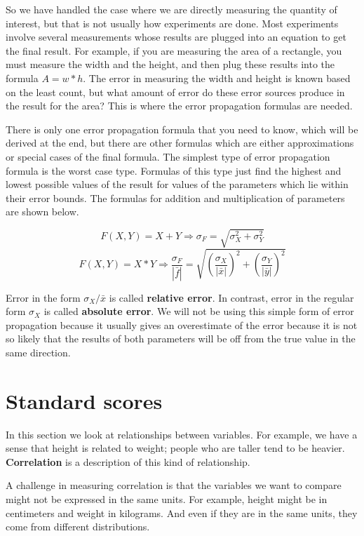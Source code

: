 So we have handled the case where we are directly measuring the quantity of interest, but that is not usually how experiments are done. Most experiments involve several measurements whose results are plugged into an equation to get the final result. For example, if you are measuring the area of a rectangle, you must measure the width and the height, and then plug these results into the formula $A = w*h$. The error in measuring the width and height is known based on the least count, but what amount of error do these error sources produce in the result for the area? This is where the error propagation formulas are needed.

There is only one error propagation formula that you need to know, which will be derived at the end, but there are other formulas which are either approximations or special cases of the final formula. The simplest type of error propagation formula is the worst case type. Formulas of this type just find the highest and lowest possible values of the result for values of the parameters which lie within their error bounds. The formulas for addition and multiplication of parameters are shown below.

\[ F(X,Y) = X + Y \Rightarrow \sigma_F = \sqrt{\sigma^2_X + \sigma^2_Y} \]
\[ F(X,Y) = X*Y \Rightarrow \frac{\sigma_F}{|\bar{f}|} =\sqrt{ \left(\frac{\sigma_X}{|\bar{x}|}\right)^2 + \left(\frac{\sigma_Y}{|\bar{y}|}\right)^2} \]

Error in the form $\sigma_X/\bar{x}$ is called \textbf{relative error}. In contrast, error in the regular form $\sigma_X$ is called \textbf{absolute error}.
We will not be using this simple form of error propagation because it usually gives an overestimate of the error because it is not so likely that the results of both parameters will be off from the true value in the same direction.



\section{Standard scores}

In this section we look at relationships between variables.  For
example, we have a sense that height is related to weight; people who
are taller tend to be heavier.  \textbf{Correlation} is a description of
this kind of relationship.

A challenge in measuring correlation is that the variables we want
to compare might not be expressed in the same units.  For example, height
might be in centimeters and weight in kilograms.  And even if they are
in the same units, they come from different distributions.



